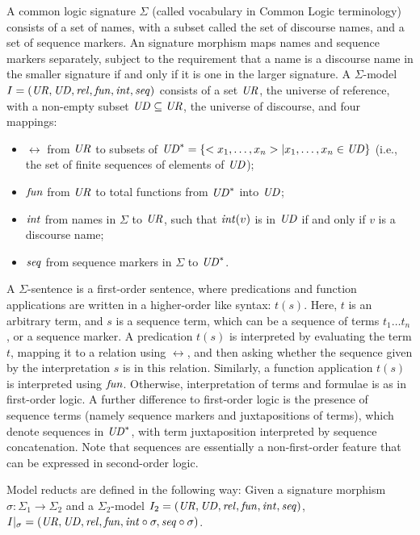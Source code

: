 \documentclass[10pt,fleqn,final]{scrreprt}
\newenvironment{definitions}[0]{\medskip }{}
\begin{document}
\begin{definitions}
\begin{definition}\label{CommonLogic}   
A common logic signature
$\Sigma$ (called vocabulary in Common Logic terminology) consists of a
set of names, with a subset called the set of discourse names, and a
set of sequence markers. An signature morphism maps
names and sequence markers separately, subject to the requirement
 that a name is a discourse
name in the smaller signature if and only if it is one in the larger signature.  A $\Sigma$-model $I=(\mathit{UR},\mathit{UD},\mathit{rel},\mathit{fun},\mathit{int},\mathit{seq})$ consists of a set $\mathit{UR}$,
the universe of reference, with a non-empty subset $\mathit{UD}\subseteq \mathit{UR}$,
the universe of discourse, and four mappings:
  \begin{itemize}
   \item $\rel$ from $\mathit{UR}$ to subsets of $\mathit{UD}^* = \{<x_1,\ldots,x_n> |
x_1,\ldots,x_n \in \mathit{UD}\}$ (i.e., the set of finite sequences of
elements of $\mathit{UD}$);
   \item $\mathit{fun}$ from $\mathit{UR}$ to total functions from $\mathit{UD}^*$ into $\mathit{UD}$;
   \item $\mathit{int}$ from names in $\Sigma$ to $\mathit{UR}$, such that
$\mathit{int}(v)$ is in $\mathit{UD}$ if and only if $v$ is a discourse name;
   \item $\mathit{seq}$ from sequence markers in $\Sigma$ to $\mathit{UD}^*$.
  \end{itemize}  A $\Sigma$-sentence is a first-order
sentence, where predications and function applications are written
in a higher-order like syntax: $t(s)$.
Here, $t$ is an arbitrary term, and $s$ is a sequence term, which can
be a sequence of terms $t_1\ldots t_n$, or a sequence marker.
A predication $t(s)$ is interpreted by evaluating the term $t$,
mapping it to a relation using $\rel$, and then asking whether the sequence
given by the interpretation $s$ is in this relation.  
Similarly, a function application $t(s)$ is interpreted using $\mathit{fun}$.
Otherwise, interpretation of terms and formulae is as in
first-order logic. 
A further
difference to first-order logic
is the presence of sequence terms (namely sequence markers and
juxtapositions of terms), which denote sequences in $\mathit{UD}^*$, with term
juxtaposition interpreted by sequence concatenation.
Note that sequences are essentially a non-first-order feature that
can be expressed in second-order logic.

Model reducts are defined in the following way: 
Given a signature morphism $\sigma:\Sigma_1\to\Sigma_2$ and a $\Sigma_2$-model
$I_2=(\mathit{UR},\mathit{UD},\mathit{rel},\mathit{fun},\mathit{int},\mathit{seq})$, $I|_{\sigma}=(\mathit{UR},\mathit{UD},\mathit{rel},\mathit{fun},\mathit{int}\circ\sigma,\mathit{seq}\circ\sigma)$. 


\end{definition}
\end{definitions}
\end{document}
